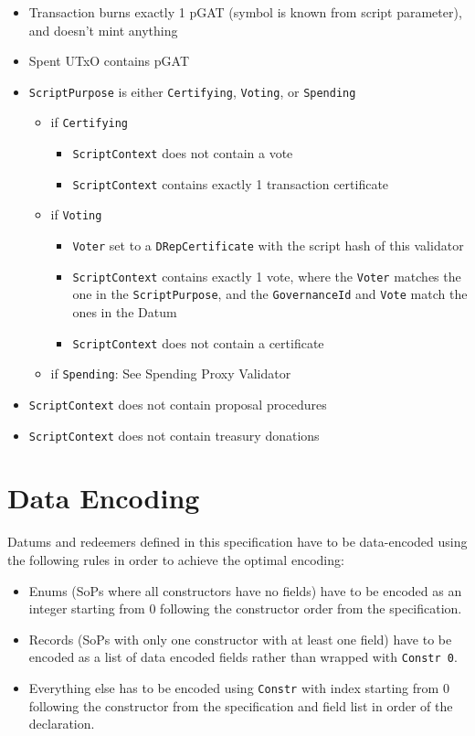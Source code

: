 \documentclass{article}
\begin{document}
\begin{itemize}
  \item Transaction burns exactly 1 pGAT (symbol is known from script parameter), and doesn't mint anything
  \item Spent UTxO contains pGAT
  \item \verb|ScriptPurpose| is either \verb|Certifying|, \verb|Voting|, or \verb|Spending|
        \begin{itemize}
          \item if \verb|Certifying|
                \begin{itemize}
                  \item \verb|ScriptContext| does not contain a vote
                  \item \verb|ScriptContext| contains exactly 1 transaction certificate
                \end{itemize}
          \item if \verb|Voting|
                \begin{itemize}
                  \item \verb|Voter| set to a \verb|DRepCertificate| with the script hash of this validator
                  \item \verb|ScriptContext| contains exactly 1 vote, where the \verb|Voter| matches the one in the \verb|ScriptPurpose|, and the \verb|GovernanceId| and \verb|Vote| match the ones in the Datum
                  \item \verb|ScriptContext| does not contain a certificate
                \end{itemize}
          \item if \verb|Spending|: See Spending Proxy Validator

        \end{itemize}
  \item \verb|ScriptContext| does not contain proposal procedures
  \item \verb|ScriptContext| does not contain treasury donations
\end{itemize}

\section{Data Encoding}

Datums and redeemers defined in this specification have to be data-encoded using the following rules in order to achieve the optimal encoding:

\begin{itemize}
  \item Enums (SoPs where all constructors have no fields) have to be encoded as an integer starting from $0$ following the constructor order from the specification.
  \item Records (SoPs with only one constructor with at least one field) have to be encoded as a list of data encoded fields rather than wrapped with \verb|Constr 0|.
  \item Everything else has to be encoded using \verb|Constr| with index starting from $0$ following the constructor from the specification and field list in order of the declaration.
\end{itemize}
\end{document}
